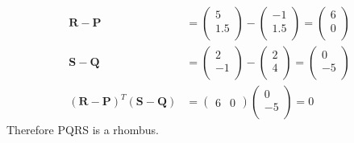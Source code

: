 \documentclass[12pt]{article}
\providecommand{\brak}[1]{\ensuremath{\left(#1\right)}}
\newcommand{\myvec}[1]{\ensuremath{\begin{pmatrix}#1\end{pmatrix}}}
\let\vec\mathbf
\begin{document}
\begin{enumerate}
\begin{align}
\vec{R}-\vec{P} &=  \myvec{
 5 \\
 1.5 \\
 } - \myvec{
 -1 \\
 1.5 \\
 } = \myvec{
 6 \\
 0 \\ 
 } \\
 \vec{S}-\vec{Q} &=  \myvec{
 2 \\
 -1 \\
 } - \myvec{
 2 \\
 4 \\
 } = \myvec{
 0 \\
 -5 \\ 
 } \\ 
 \brak{\vec{R}-\vec{P}}^{T}\brak{\vec{S}-\vec{Q}} &= \myvec{
 6 & 0} \myvec{
 0 \\
 -5 \\
 } = 0
\end{align}
Therefore PQRS is a rhombus.

\end{enumerate}
\end{document}
